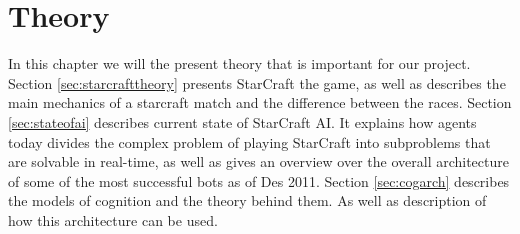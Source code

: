 
\chapter{Theory}
In this chapter we will the present theory that is important for our project.
Section \ref{sec:starcrafttheory} presents StarCraft the game, as well as
describes the main mechanics of a starcraft match and the difference between the
races. Section \ref{sec:stateofai} describes current state of StarCraft AI. It
explains how agents today divides the complex problem of playing StarCraft into
subproblems that are solvable in real-time, as well as gives an overview over
the overall architecture of some of the most successful bots as of Des 2011.
Section \ref{sec:cogarch} describes the models of cognition and the theory
behind them. As well as description of how this architecture can be used. 


